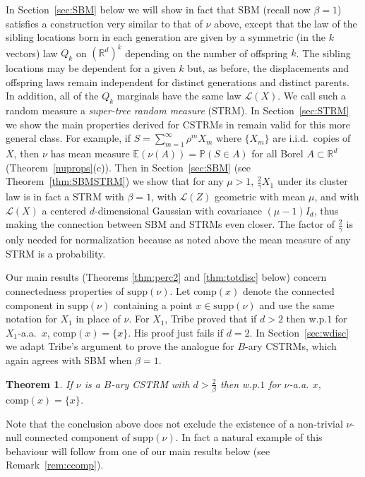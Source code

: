 \documentclass[12pt]{article}
\newtheorem{theorem}{Theorem}
\numberwithin{theorem}{section}
\theoremstyle{def}
\numberwithin{equation}{section}
\renewcommand{\P}{\mathbb{P}}
\newcommand{\E}{\mathbb{E}}
\newcommand{\R}{\mathbb{R}}
\newcommand{\cL}{\mathcal{L}}
\newcommand{\supp}{\mathrm{supp}}
\begin{document}
In Section~\ref{sec:SBM} below we will show in fact that SBM (recall now $\beta=1$)  satisfies a construction very similar to that of $\nu$ above, except that the law of the sibling locations born in each generation are given by a symmetric (in the $k$ vectors) law $Q_k$ on $(\R^d)^k$ depending on the number of offspring $k$.  
The sibling locations may be dependent for a given $k$ but, as before, the displacements and offspring laws remain independent for distinct generations and distinct parents. 
In addition, all of the $Q_k$ marginals have the same law $\cL(X)$. 
We call such a random measure a \emph{super-tree random measure} (STRM). 
In Section~\ref{sec:STRM} we show the main properties derived for CSTRMs in \cite{ADHP} remain valid for this more general class. 
For example, if $S=\sum_{m=1}^\infty \rho^mX_m$ where $\{X_m\}$ are i.i.d.\ copies of $X$, then $\nu$ has mean measure $\E(\nu(A))=\P(S\in A)$ for all Borel $A\subset\R^d$ (Theorem~\ref{nuprops}(c)).  
Then in Section~\ref{sec:SBM} (see Theorem~\ref{thm:SBMSTRM}) we show that for any $\mu>1$, $\frac{2}{\gamma}X_1$  under its cluster law is in fact a STRM with $\beta=1$, with $\cL(Z)$ geometric with mean $\mu$, and with $\cL(X)$ a centered $d$-dimensional Gaussian with covariance $(\mu-1)I_d$, thus making the connection between SBM and STRMs even closer.  
The factor of $\frac{2}{\gamma}$ is only needed for normalization because as noted above the mean measure of any STRM is a probability.

Our main results (Theorems \ref{thm:perc2} and \ref{thm:totdisc} below) concern connectedness properties of $\supp(\nu)$.  
Let $\text{comp}(x)$ denote the connected component in $\supp(\nu)$ containing a point $x\in\supp(\nu)$ and use the same notation for $X_1$ in place of $\nu$. 
For $X_1$, Tribe \cite{T91} proved that if $d>2$ then w.p.$1$ for $X_1$-a.a.\ $x$, $\text{comp}(x)=\{x\}$. 
His proof just fails if $d=2$. 
In Section~\ref{sec:wdisc} we adapt Tribe's argument to prove the analogue for $B$-ary CSTRMs, which again agrees with SBM when $\beta=1$.
\begin{theorem}\label{thm:nutribe}
If $\nu$ is a $B$-ary CSTRM with $d>\frac{2}{\beta}$ then w.p.$1$ for $\nu$-a.a. $x$, $\text{comp}(x)=\{x\}$. 
\end{theorem}
\noindent Note that the conclusion above does not exclude the existence of a non-trivial $\nu$-null connected component of $\supp(\nu)$. 
In fact a natural example of this behaviour will follow from one of our main results below (see Remark~\ref{rem:ccomp}). 
\end{document}
